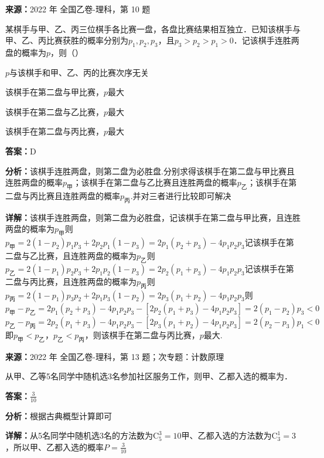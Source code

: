 \begin{question}[points=5]
\textbf{来源：}2022 年 全国乙卷-理科，第 10 题\par
某棋手与甲、乙、丙三位棋手各比赛一盘，各盘比赛结果相互独立．已知该棋手与甲、乙、丙比赛获胜的概率分别为$p_1, p_2, p_3$，且$p_3 > p_2 > p_1 > 0$．记该棋手连胜两盘的概率为$p$，则（\qquad）
\begin{choices}
  \item $p$与该棋手和甲、乙、丙的比赛次序无关
  \item 该棋手在第二盘与甲比赛，$p$最大
  \item 该棋手在第二盘与乙比赛，$p$最大
  \item 该棋手在第二盘与丙比赛，$p$最大
\end{choices}
\begin{solution}
\textbf{答案：}D

\textbf{分析：}该棋手连胜两盘，则第二盘为必胜盘.分别求得该棋手在第二盘与甲比赛且连胜两盘的概率$p_{\text{甲}}$；该棋手在第二盘与乙比赛且连胜两盘的概率$p_{\text{乙}}$；该棋手在第二盘与丙比赛且连胜两盘的概率$p_{\text{丙}}$.并对三者进行比较即可解决

\textbf{详解：}该棋手连胜两盘，则第二盘为必胜盘，记该棋手在第二盘与甲比赛，且连胜两盘的概率为$p_{\text{甲}}$则$p_{\text{甲}} = 2(1-p_2)p_1p_3 + 2p_2p_1(1-p_3) = 2p_1(p_2+p_3) - 4p_1p_2p_3$记该棋手在第二盘与乙比赛，且连胜两盘的概率为$p_{\text{乙}}$则$p_{\text{乙}} = 2(1-p_1)p_2p_3 + 2p_1p_2(1-p_3) = 2p_2(p_1+p_3) - 4p_1p_2p_3$记该棋手在第二盘与丙比赛，且连胜两盘的概率为$p_{\text{丙}}$则$p_{\text{丙}} = 2(1-p_1)p_3p_2 + 2p_1p_3(1-p_2) = 2p_3(p_1+p_2) - 4p_1p_2p_3$则$p_{\text{甲}} - p_{\text{乙}} = 2p_1(p_2+p_3) - 4p_1p_2p_3 - [2p_2(p_1+p_3) - 4p_1p_2p_3] = 2(p_1-p_2)p_3 < 0$\\$p_{\text{乙}} - p_{\text{丙}} = 2p_2(p_1+p_3) - 4p_1p_2p_3 - [2p_3(p_1+p_2) - 4p_1p_2p_3] = 2(p_2-p_3)p_1 < 0$即$p_{\text{甲}} < p_{\text{乙}}$，$p_{\text{乙}} < p_{\text{丙}}$，则该棋手在第二盘与丙比赛，$p$最大.
\end{solution}
\end{question}

\begin{question}[points=5]
\textbf{来源：}2022 年 全国乙卷-理科，第 13 题；次专题：计数原理\par
从甲、乙等5名同学中随机选3名参加社区服务工作，则甲、乙都入选的概率为．
\fillin[{$\frac{3}{10}$}]
\begin{solution}
\textbf{答案：}$\frac{3}{10}$

\textbf{分析：}根据古典概型计算即可

\textbf{详解：}从5名同学中随机选3名的方法数为$\mathrm{C}_5^3 = 10$甲、乙都入选的方法数为$\mathrm{C}_3^1 = 3$，所以甲、乙都入选的概率$P = \frac{3}{10}$
\end{solution}
\end{question}

